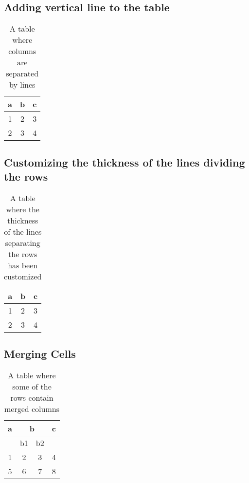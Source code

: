 \subsection{Adding vertical line to the table}
\begin{table}[!htbp]
\begin{tabular}{|c|c|c|}
\hline
a & b & c \\
\hline
1 & 2 & 3 \\
2 & 3 & 4\\
\hline
\end{tabular}
\caption[Column Separation]{A table where columns are separated by lines}
\label{vlTable}
\end{table}

\subsection{Customizing the thickness of the lines dividing the rows}
\begin{table}[!htbp]
\begin{tabular}{ccc}
\toprule[1.5pt]
a & b & c \\
\midrule[1.0pt]
1 & 2 & 3 \\
2 & 3 & 4\\
\bottomrule[1.5pt]
\end{tabular}
\caption[Customize line thickness]{A table where the thickness of the lines separating the rows has been customized}
\label{cltTable}
\end{table}

\newpage
\subsection{Merging Cells}
\begin{table}[!htbp]
\begin{center}
\begin{tabular}{cccc}
\hline
a & \multicolumn{2}{c}{b} & c\\
\hline
 & b1 & b2 & \\
\hline
1 & 2 & 3 & 4 \\
5 & 6 & 7 & 8 \\
\end{tabular}
\caption[Merge cells]{A table where some of the rows contain merged columns}
\label{mcTable}
\end{center}
\end{table}





